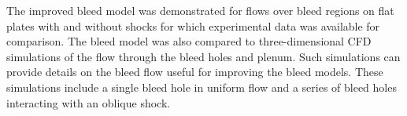 The improved bleed model was demonstrated for flows over bleed regions on flat plates with and without shocks for which experimental data was available for comparison. The bleed model was also compared to three-dimensional CFD simulations of the flow through the bleed holes and plenum. Such simulations can provide details on the bleed flow useful for improving the bleed models. These simulations include a single bleed hole in uniform flow and a series of bleed holes interacting with an oblique shock. \cite{Slater2012}

